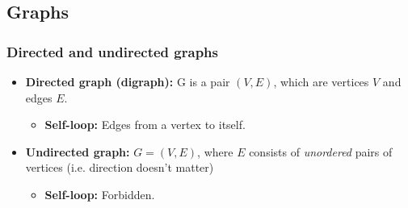 \subsection{Graphs}
    \subsubsection{Directed and undirected graphs}
        \begin{definition}
            \begin{itemize}
                \item \textbf{Directed graph (digraph):} G is a pair $(V,E)$, which are vertices $V$ and edges $E$.
                \begin{itemize}
                    \item \textbf{Self-loop:} Edges from a vertex to itself.
                \end{itemize}
                \item \textbf{Undirected graph:} $G=(V,E)$, where $E$ consists of \emph{unordered} pairs of vertices (i.e. direction doesn't matter)
                \begin{itemize}
                    \item \textbf{Self-loop:} Forbidden.
                \end{itemize}
            \end{itemize}
        \end{definition}


